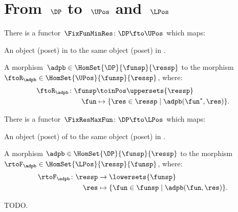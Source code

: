   

\section{From~$\DP$ to~$\UPos$ and~$\LPos$}
\begin{lemma}
\label{lem:covfunctor}
There is a functor~$\FixFunMinRes\colon \DP \fto \UPos$ which maps:
\begin{compactenum}
\item An object (poset) in \DP to the same object (poset) in \UPos.
\item A morphism~$\adpb\in \HomSet{\DP}{\funsp}{\ressp}$ to the morphism~$\ftoR_{\adpb}\in \HomSet{\UPos}{\funsp}{\ressp}$, where:
\begin{equation}
\begin{aligned}
    \ftoR_{\adpb}\colon \funsp &\toinPos \uppersets{\ressp}\\
    \fun&\mapsto \{\res \in \ressp\mid \adpb(\fun^*,\res)\}.
\end{aligned}
\end{equation}
\end{compactenum}
\end{lemma}

\begin{lemma}
\label{lem:confunctor}
There is a functor~$\FixResMaxFun\colon \DP \fto \LPos$ which maps:
\begin{compactenum}
\item An object (poset) of \DP to the same object (poset) in \LPos.
\item A morphism $\adpb \in \HomSet{\DP}{\funsp}{\ressp}$ to the morphism~$\rtoF_\adpb\in \HomSet{\LPos}{\ressp}{\funsp}$, where:
\begin{equation*}
    \begin{aligned}
    \rtoF_\adpb\colon \ressp &\to \lowersets{\funsp}\\
    \res&\mapsto \{ \fun \in \funsp \mid \adpb(\fun,\res)\}.
    \end{aligned}
\end{equation*}
\end{compactenum}
\end{lemma}

\begin{marginfigure}
\begin{center}
\end{center}
    \caption{TODO.}
\end{marginfigure}


